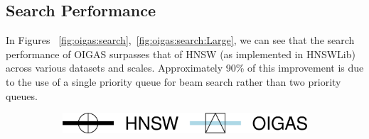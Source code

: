 \subsection{Search Performance}
In Figures ~\ref{fig:oigas:search},~\ref{fig:oigas:search:Large}, we can see that the search performance of OIGAS surpasses that of HNSW (as implemented in HNSWLib) across various datasets and scales. Approximately 90\% of this improvement is due to the use of a single priority queue for beam search rather than two priority queues.


\begin{figure}[ht]
    \centering
    \captionsetup{justification=centering}
	\centering

		\captionsetup{justification=centering}
		\captionsetup[subfigure]{justification=centering}
        \begin{subfigure}[b]{\textwidth}
        \centering
 		\includegraphics[width=0.3\columnwidth]{../img/oigas/Search/legend.png}
    \end{subfigure}


\end{figure}
